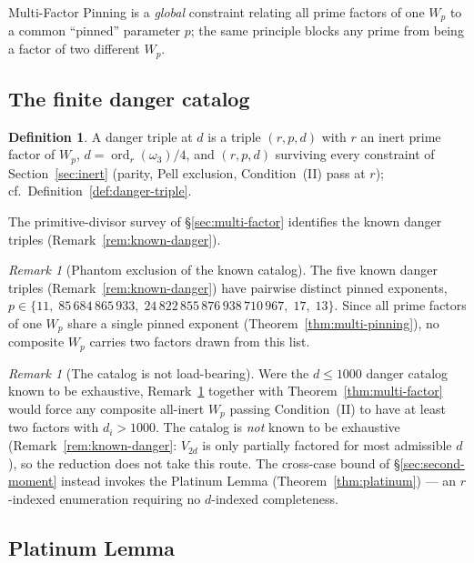 \documentclass[11pt]{amsart}
\theoremstyle{plain}
\theoremstyle{definition}
\newtheorem{definition}[theorem]{Definition}
\theoremstyle{remark}
\newtheorem{remark}[theorem]{Remark}
\numberwithin{equation}{section}
\newcommand{\ord}{\operatorname{ord}}
\begin{document}
Multi-Factor Pinning is a \emph{global} constraint relating all prime factors of one $W_p$ to a common ``pinned'' parameter $p$; the same principle blocks any prime from being a factor of two different $W_p$.

\subsection{The finite danger catalog}

\begin{definition}\label{def:danger-at-d}
A danger triple at $d$ is a triple $(r, p, d)$ with $r$ an inert prime factor of $W_p$, $d = \ord_r(\omega_3)/4$, and $(r, p, d)$ surviving every constraint of Section~\ref{sec:inert} (parity, Pell exclusion, Condition~(II) pass at $r$); cf.\ Definition~\ref{def:danger-triple}.
\end{definition}

The primitive-divisor survey of \S\ref{sec:multi-factor} identifies the known danger triples (Remark~\ref{rem:known-danger}).

\begin{remark}[Phantom exclusion of the known catalog]\label{rem:phantom-exclusion}
The five known danger triples (Remark~\ref{rem:known-danger}) have pairwise distinct pinned exponents, $p \in \{11,\; 85\,684\,865\,933,\; 24\,822\,855\,876\,938\,710\,967,\; 17,\; 13\}$. Since all prime factors of one $W_p$ share a single pinned exponent (Theorem~\ref{thm:multi-pinning}), no composite $W_p$ carries two factors drawn from this list.
\end{remark}

\begin{remark}[The catalog is not load-bearing]\label{rem:catalog-not-loadbearing}
Were the $d \leq 1000$ danger catalog known to be exhaustive, Remark~\ref{rem:phantom-exclusion} together with Theorem~\ref{thm:multi-factor} would force any composite all-inert $W_p$ passing Condition~(II) to have at least two factors with $d_i > 1000$. The catalog is \emph{not} known to be exhaustive (Remark~\ref{rem:known-danger}: $V_{2d}$ is only partially factored for most admissible $d$), so the reduction does not take this route. The cross-case bound of \S\ref{sec:second-moment} instead invokes the Platinum Lemma (Theorem~\ref{thm:platinum}) --- an $r$-indexed enumeration requiring no $d$-indexed completeness.
\end{remark}

\subsection{Platinum Lemma}
\end{document}
